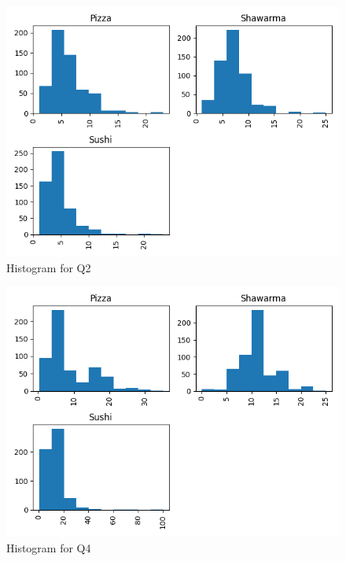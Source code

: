 \begin{figure}[t!]
    \centerline{\includegraphics[width=\columnwidth]{data/histogram_Q2.png}}
    \caption{Histogram for Q2}
    \label{f:hist_q2}
\end{figure}

\begin{figure}[t!]
    \centerline{\includegraphics[width=\columnwidth]{data/histogram_Q4.png}}
    \caption{Histogram for Q4}
    \label{f:hist_q3}
\end{figure}